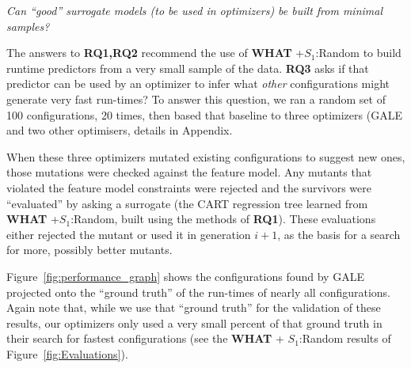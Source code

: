 \documentclass{sig-alternative}
\newcommand{\fig}[1]{Figure~\ref{fig:#1}}
\newcommand{\what}{{\bf WHAT }}
\begin{document}
 {\em
Can ``good'' surrogate models (to be used in optimizers)
be built from minimal samples?}

The answers to {\bf RQ1,RQ2} recommend the use of \what+$S_1$:Random to build runtime predictors from a very small sample
of the data. {\bf RQ3}
asks if that predictor can be used by an optimizer to infer what {\em other} configurations might generate very fast run-times?
To answer this question,  we ran  a random set of 100 
configurations, 20 times, then based that baseline to three optimizers (GALE and two 
other optimisers,  details in Appendix.


When these three optimizers mutated existing configurations to suggest new ones,
those mutations were checked against the feature model. Any mutants that violated the feature model constraints were rejected
and the survivors were ``evaluated'' by asking a surrogate
(the  CART regression tree learned from \what+$S_1$:Random, built using the methods of {\bf RQ1}).
These evaluations either rejected the mutant or used it in generation $i+1$, as the basis for a search for more, possibly
better  mutants.

\fig{performance_graph} shows the configurations found by GALE projected onto the ``ground truth'' of the run-times of nearly
all configurations. Again note that, while we use that ``ground truth'' for the validation of these results, our optimizers only
used a very small percent of that ground truth in their search for fastest configurations (see the \what + $S_1$:Random
results of \fig{Evaluations}).
\end{document}
